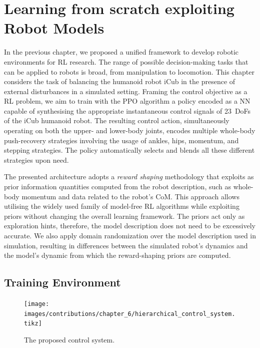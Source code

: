 \chapter{Learning from scratch exploiting Robot Models}
\label{ch:learning_from_scratch}

In the previous chapter, we proposed a unified framework to develop robotic environments for \ac{RL} research.
The range of possible decision-making tasks that can be applied to robots is broad, from manipulation to locomotion.
This chapter considers the task of balancing the humanoid robot iCub in the presence of external disturbances in a simulated setting.
Framing the control objective as a \ac{RL} problem, we aim to train with the \ac{PPO} algorithm a policy encoded as a \ac{NN} capable of synthesising the appropriate instantaneous control signals of 23~\acp{DoF} of the iCub humanoid robot.
The resulting control action, simultaneously operating on both the upper- and lower-body joints, encodes multiple whole-body push-recovery strategies involving the usage of ankles, hips, momentum, and stepping strategies.
The policy automatically selects and blends all these different strategies upon need.

The presented architecture adopts a \emph{reward shaping} methodology that exploits as prior information quantities computed from the robot description, such as whole-body momentum and data related to the robot's \ac{CoM}.
This approach allows utilising the widely used family of model-free \ac{RL} algorithms while exploiting priors without changing the overall learning framework.
The priors act only as exploration hints, therefore, the model description does not need to be excessively accurate.
We also apply domain randomization over the model description used in simulation, resulting in differences between the simulated robot's dynamics and the model's dynamic from which the reward-shaping priors are computed.

\section{Training Environment}

\begin{figure}
    \centering
    \texttt{[image: images/contributions/chapter\_6/hierarchical\_control\_system.tikz]}
    \caption{The proposed control system.}
    \label{fig:hierarchical}
\end{figure}

